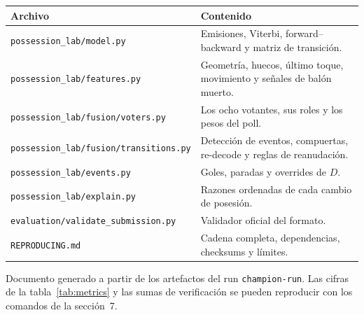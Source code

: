 \documentclass[10pt,a4paper]{article}
\newcommand{\code}[1]{\texttt{\small #1}}
\begin{document}
\begin{center}
\footnotesize
\begin{tabularx}{\textwidth}{@{}>{\raggedright\arraybackslash}p{6.1cm}X@{}}
\toprule
Archivo & Contenido \\
\midrule
\code{possession\_lab/model.py} & Emisiones, Viterbi, forward--backward y matriz de transición. \\
\code{possession\_lab/features.py} & Geometría, huecos, último toque, movimiento y señales de balón muerto. \\
\code{possession\_lab/fusion/voters.py} & Los ocho votantes, sus roles y los pesos del poll. \\
\code{possession\_lab/fusion/transitions.py} & Detección de eventos, compuertas, re-decode y reglas de reanudación. \\
\code{possession\_lab/events.py} & Goles, paradas y overrides de $D$. \\
\code{possession\_lab/explain.py} & Razones ordenadas de cada cambio de posesión. \\
\code{evaluation/validate\_submission.py} & Validador oficial del formato. \\
\code{REPRODUCING.md} & Cadena completa, dependencias, checksums y límites. \\
\bottomrule
\end{tabularx}
\end{center}

\vspace{2pt}
{\footnotesize\color{slate}Documento generado a partir de los artefactos del run
\texttt{champion-run}. Las cifras de la tabla~\ref{tab:metrics} y las sumas de verificación se
pueden reproducir con los comandos de la sección~7.}
\end{document}

